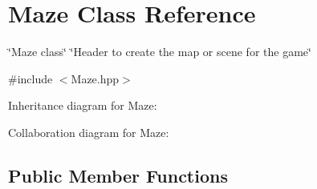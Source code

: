 \hypertarget{classMaze}{}\section{Maze Class Reference}
\label{classMaze}


\char`\"{}\+Maze class\char`\"{}  \char`\"{}\+Header to create the map or scene for the game\char`\"{}  




{\ttfamily \#include $<$Maze.\+hpp$>$}



Inheritance diagram for Maze\+:


Collaboration diagram for Maze\+:
\subsection*{Public Member Functions}
